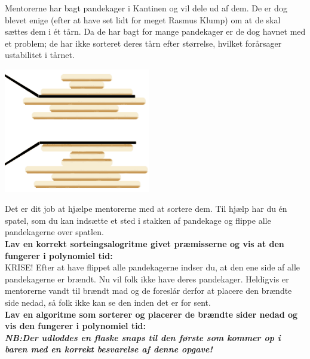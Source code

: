 Mentorerne har bagt pandekager i Kantinen og vil dele ud af dem. De er
dog blevet enige (efter at have set lidt for meget Rasmus Klump) om at de skal
sættes dem i ét tårn. Da de har bagt for mange pandekager er de
dog havnet med et problem; de har ikke sorteret deres tårn efter størrelse,
hvilket forårsager ustabilitet i tårnet.
\begin{center}
\includegraphics[width=0.48\textwidth]{figures/pandekager.png}
\end{center}
Det er dit job at hjælpe mentorerne med at sortere dem. Til hjælp har du én
spatel, som du kan indsætte et sted i stakken af pandekage og flippe alle
pandekagerne over spatlen.\\
\textbf{Lav en korrekt sorteingsalogritme givet præmisserne og vis at den
fungerer i polynomiel tid:}\\
KRISE! Efter at have flippet alle pandekagerne indser du, at den ene side af
alle pandekagerne er brændt. Nu vil folk ikke have deres pandekager. Heldigvis
er mentorerne vandt til brændt mad og de foreslår derfor at placere den brændte
side nedad, så folk ikke kan se den inden det er for sent.\\
\textbf{Lav en algoritme som sorterer og placerer de brændte sider nedad og vis
den fungerer i polynomiel tid:}\\
%

\textbf{\emph{NB:\@ Der udloddes en flaske snaps til den første som kommer op i
baren med en korrekt besvarelse af denne opgave!}}
